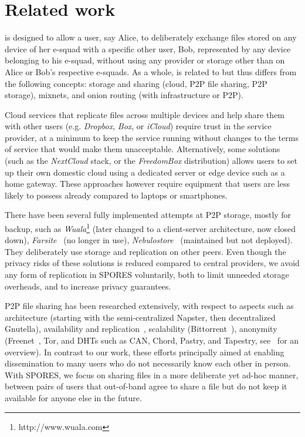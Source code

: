 \section{Related work}%
\label{RelatedWork}

\name is designed to allow a user, say Alice,  to deliberately exchange files stored on any device of her e-squad with a specific other user, Bob, represented by any device belonging to his e-squad, without using any provider or storage other than on Alice or Bob's respective e-squads. As a whole, \name is related to but thus differs from the following concepts: storage and sharing (cloud, P2P file sharing, P2P storage),  mixnets, and onion routing (with infrastructure or P2P).  

Cloud services that replicate files across multiple devices and help share them with other users (e.g. \emph{Dropbox}, \emph{Box}, or \emph{iCloud}) require trust in the service provider, at a minimum to keep the service running without changes to the terms of service that would make them unacceptable. Alternatively, some solutions (such as the \emph{NextCloud} stack, or the \emph{FreedomBox} distribution) allows users to set up their own domestic cloud using a dedicated server or edge device such as a home gateway. These approaches however require equipment that users are less likely to possess already compared to laptops or smartphones. 

There have been several fully implemented attempts at P2P storage, mostly for backup, such as \emph{Wuala}\footnote{http://www.wuala.com} (later changed to a client-server architecture, now closed down), \emph{Farsite}~\cite{farsite} (no longer in use), \emph{Nebulostore}~\cite{nebulo} (maintained but not deployed). They deliberately use storage and replication on other peers. Even though the privacy risks of these solutions is reduced compared to central providers, we avoid any form of replication in \ac{SPORES} voluntarily, both to limit unneeded storage overheads, and to increase privacy guarantees.

P2P file sharing has been researched extensively, with respect to aspects such 
as architecture (starting with the semi-centralized Napster, then decentralized 
Gnutella), availability and replication~\cite{replica}, scalability 
(Bittorrent~\cite{bittorrent-incentives}), anonymity 
(Freenet~\cite{Clarke:2001}, \ac{Tor}, and \acp{DHT} such as CAN, Chord, 
Pastry, and Tapestry, see~\cite{dhtchurn} for an overview). In contrast to our 
work, these efforts principally aimed at enabling dissemination to many users 
who do not necessarily know each other in person. With \ac{SPORES}, we focus on 
sharing files in a more deliberate yet ad-hoc manner, \ie between pairs of 
users that out-of-band agree to share a file but do not keep it available for 
anyone else in the future. 

